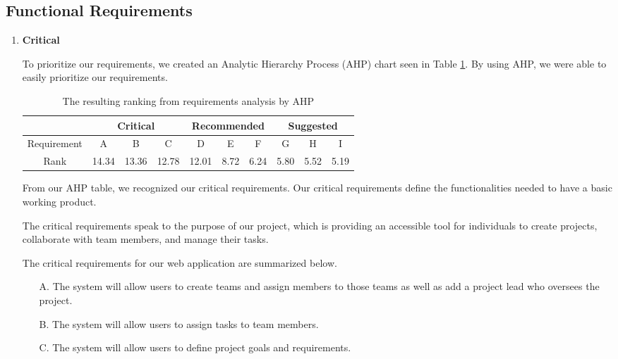 \subsection{Functional Requirements}
\begin{enumerate}
\item \textbf{Critical}
\par To prioritize our requirements, we created an Analytic Hierarchy Process (AHP) chart seen in Table \ref{ahp}. By using AHP, we were able to easily prioritize our requirements.
\FloatBarrier
\begin{table}[ht]
\centering
\begin{tabular}{|c|c|c|c|c|c|c|c|c|c|}
	\hline
	\multicolumn{1}{|c|}{} & \multicolumn{3}{|c|}{\bfseries Critical} & \multicolumn{3}{|c|}{\bfseries Recommended} & \multicolumn{3}{|c|}{\bfseries Suggested} \\ 
	\hline
	Requirement & A & B & C & D & E & F & G & H & I  \\
	\hline
	Rank & 14.34 & 13.36 & 12.78 & 12.01 & 8.72 & 6.24 & 5.80 & 5.52 & 5.19 \\
	\hline
\end{tabular}
\caption{The resulting ranking from requirements analysis by AHP}
\label{ahp}
\end{table}
\FloatBarrier

\par From our AHP table, we recognized our critical requirements. Our critical requirements define the functionalities needed to have a basic working product. 

\par The critical requirements speak to the purpose of our project, which is providing an accessible tool for individuals to create projects, collaborate with team members, and manage their tasks.

\par The critical requirements for our web application are summarized below.
	\begin{enumerate}
	\item[A.] The system will allow users to create teams and assign members to those teams as well as add a project lead who oversees the project. 
	\item[B.] The system will allow users to assign tasks to team members.
	\item[C.] The system will allow users to define project goals and requirements.


\end{enumerate}
\end{enumerate}
